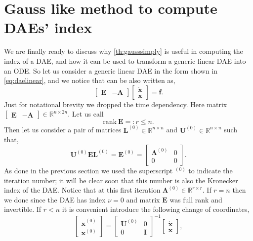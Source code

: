 	\section{Gauss like method to compute DAEs' index}
		We are finally ready to discuss why \cref{th:gausssimply} is useful 
		in computing the index of a DAE, and how it can be used to transform 
		a generic linear DAE into an ODE. So let us consider a generic
		linear DAE in the form shown in \cref{eq:daelinear},
		and we notice that can be also written as, 
		\begin{equation}
			\label{eq:computationalDAE}
			\begin{bmatrix}
				\bm{E} & -\bm{A} 
			\end{bmatrix}
			\begin{bmatrix}
				\dot{\bm{x}} \\
				\bm{x}
			\end{bmatrix}
			= \bm{f}.
		\end{equation}
		Just for notational brevity we dropped the time dependency.
		Here matrix $\begin{bmatrix}\bm{E} & -\bm{A}\end{bmatrix}\in\mathbb{R}^{n\times 2n}$.
		Let us call
		\begin{equation}
			\textrm{rank}~\bm{E} =: r \leq n.
		\end{equation}
		Then let us consider a pair of matrices 
		$\bm{L}^{(0)}\in\mathbb{R}^{n\times n}$ and 
		$\bm{U}^{(0)}\in\mathbb{R}^{n\times n}$ such that,
		\begin{equation*}
			\bm{U}^{(0)}\bm{E}\bm{L}^{(0)} = \bm{E}^{(0)} = 
			\begin{bmatrix}
				\bm{\Lambda}^{(0)} 	& 0 \\
				0 				& 0 
			\end{bmatrix}.
		\end{equation*}
		As done in the previous section we used the superscript $^{(0)}$ to 
		indicate the iteration number; it will be clear soon that this number
		is also the Kronecker index of the DAE. Notice that at this first
		iteration $\bm{\Lambda}^{(0)}\in\mathbb{R}^{r\times r}$.
		If $r=n$ then we done since the DAE has index $\nu = 0$ and
		matrix $\bm{E}$ was full rank and invertible. If $r<n$ it is
		convenient introduce the following change of coordinates, 
		\begin{equation}
			\begin{bmatrix}
				\dot{\bm{x}}^{(0)} \\
				\bm{x}^{(0)} 
			\end{bmatrix}
			=
			\begin{bmatrix}
				\bm{U}^{(0)} & 0 \\
				0 & \bm{I} 
			\end{bmatrix}^{-1}
			\begin{bmatrix}
				\dot{\bm{x}} \\
				\bm{x}
			\end{bmatrix},
		\end{equation}
